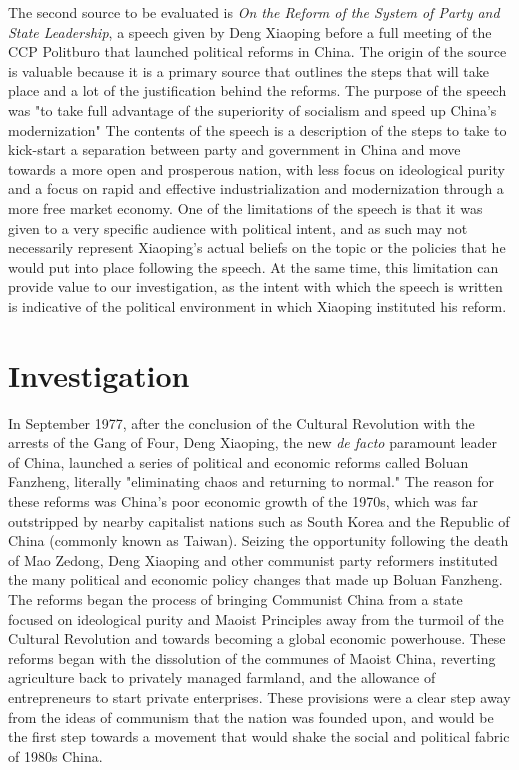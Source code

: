 \documentclass{paper}
\begin{document}
The second source to be evaluated is \textit{On the Reform of the System of Party and State Leadership},\autocite{reforms} a speech given by Deng Xiaoping before a full meeting of the CCP Politburo that launched political reforms in China.
The origin of the source is valuable because it is a primary source that outlines the steps that will take place and a lot of the justification behind the reforms.
The purpose of the speech was "to take full advantage of the superiority of socialism and speed up China's modernization" The contents of the speech is a description of the steps to take to kick-start a separation between party and government in China and move towards a more open and prosperous nation, with less focus on ideological purity and a focus on rapid and effective industrialization and modernization through a more free market economy.
One of the limitations of the speech is that it was given to a very specific audience with political intent, and as such may not necessarily represent Xiaoping's actual beliefs on the topic or the policies that he would put into place following the speech.
At the same time, this limitation can provide value to our investigation, as the intent with which the speech is written is indicative of the political environment in which Xiaoping instituted his reform.

\section{Investigation}
In September 1977, after the conclusion of the Cultural Revolution with the arrests of the Gang of Four, Deng Xiaoping, the new \emph{de facto} paramount leader of China, launched a series of political and economic reforms called Boluan Fanzheng, literally "eliminating chaos and returning to normal."
The reason for these reforms was China's poor economic growth of the 1970s, which was far outstripped by nearby capitalist nations such as South Korea and the Republic of China (commonly known as Taiwan).
Seizing the opportunity following the death of Mao Zedong, Deng Xiaoping and other communist party reformers instituted the many political and economic policy changes that made up Boluan Fanzheng.
The reforms began the process of bringing Communist China from a state focused on ideological purity and Maoist Principles away from the turmoil of the Cultural Revolution and towards becoming a global economic powerhouse.
These reforms began with the dissolution of the communes of Maoist China, reverting agriculture back to privately managed farmland, and the allowance of entrepreneurs to start private enterprises.\autocite{reforms}
These provisions were a clear step away from the ideas of communism that the nation was founded upon, and would be the first step towards a movement that would shake the social and political fabric of 1980s China.
\end{document}
